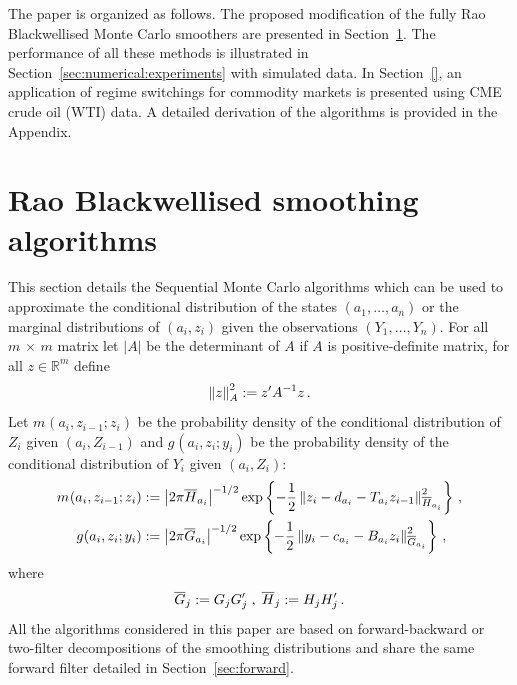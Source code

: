 The paper is organized as follows. The proposed modification of the fully Rao Blackwellised Monte Carlo smoothers are presented in Section~\ref{sec:RaoBlackwell}. The performance of all these methods is illustrated in Section~\ref{sec:numerical:experiments} with simulated data. In Section~\ref{}, an application of regime switchings for commodity markets is presented using CME crude oil (WTI) data. A detailed derivation of the algorithms is provided in the Appendix.


\section{Rao Blackwellised smoothing algorithms}
\label{sec:RaoBlackwell}
This section details the Sequential Monte Carlo algorithms which can be used to approximate the conditional distribution of the states $(a_1,\ldots,a_n)$ or the marginal distributions of $(a_i,z_{i})$ given the observations $(Y_1,\ldots,Y_n)$. For all $m\,\times\,m$ matrix  let $|A|$ be the determinant of $A$ if $A$ is positive-definite matrix, for all $z\in\mathbb{R}^{m}$ define
\[
\normMat{A}{z}^2 \eqdef z'A^{-1}z\eqsp.
\]
Let $m_{}(a_{i},z_{i-1};z_i)$ be the probability density of the conditional distribution of $Z_i$ given $(a_{i},Z_{i-1})$ and $g_{}(a_{i},z_{i};y_i)$ be the probability density of the conditional distribution of $Y_i$ given $(a_{i},Z_{i})$:
\begin{align}
\label{eq:definition-m}
m_{}(a_{i},z_{i-1};z_i) & \eqdef \left|2\pi\barH_{a_i}\right|^{-1/2}\exp\left\{-\frac{1}{2}\normMat{\barH_{a_i}}{z_i -d_{a_{i}} -T_{a_{i}}z_{i-1}}^2\right\}\eqsp,\\
\label{eq:definition-g}
g_{}(a_{i},z_{i};y_i) & \eqdef \left|2\pi\barG_{a_i}\right|^{-1/2}\exp\left\{-\frac{1}{2}\normMat{\barG_{a_i}}{y_i - c_{a_i} - B_{a_i}z_{i}}^2\right\}\eqsp,
\end{align}
where
\[
\barG_j \eqdef G_jG'_j\;,\; \barH_{j} \eqdef H_jH'_j\eqsp.
\]
All the algorithms considered in this paper are based on forward-backward or two-filter decompositions of the smoothing distributions and share the same forward filter detailed in Section~\ref{sec:forward}.

